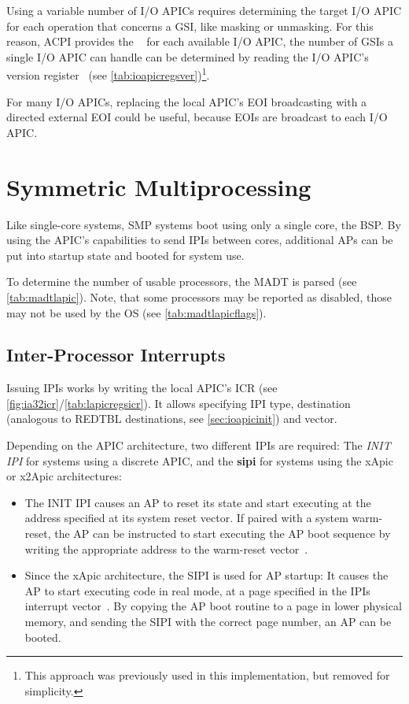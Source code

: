 Using a variable number of I/O APICs requires determining the target I/O APIC for each operation that concerns a GSI, like masking or unmasking.
For this reason, ACPI provides the ~\autocite[sec.~5.2.8.2]{acpi1} for each available I/O APIC, the number of GSIs a single I/O APIC can handle can be determined by reading the I/O APIC's version register~\autocite[sec.~9.5.7]{ich5} (see \autoref{tab:ioapicregsver})\footnote{
  This approach was previously used in this implementation, but removed for simplicity.}.

For many I/O APICs, replacing the local APIC's EOI broadcasting with a directed external EOI could be useful, because EOIs are broadcast to each I/O APIC\@.

\section{Symmetric Multiprocessing}
\label{sec:smpinit}

Like single-core systems, SMP systems boot using only a single core, the BSP\@.
By using the APIC's capabilities to send IPIs between cores, additional APs can be put into startup state and booted for system use.

To determine the number of usable processors, the MADT is parsed (see \autoref{tab:madtlapic}).
Note, that some processors may be reported as disabled, those may not be used by the OS (see \autoref{tab:madtlapicflags}).

\subsection{Inter-Processor Interrupts}
\label{subsec:ipis}

Issuing IPIs works by writing the local APIC's ICR (see \autoref{fig:ia32icr}/\autoref{tab:lapicregsicr}).
It allows specifying IPI type, destination (analogous to REDTBL destinations, see \autoref{sec:ioapicinit}) and vector.

Depending on the APIC architecture, two different IPIs are required: The \textit{INIT IPI} for systems using a discrete APIC, and the \textbf{\gls{sipi}} for systems using the xApic or x2Apic architectures:

\begin{itemize}
  \item The INIT IPI causes an AP to reset its state and start executing at the address specified at its system reset vector.
  If paired with a system warm-reset, the AP can be instructed to start executing the AP boot sequence by writing the appropriate address to the warm-reset vector~\autocite[sec.~B.4.1]{mpspec}.
  \item Since the xApic architecture, the SIPI is used for AP startup: It causes the AP to start executing code in real mode, at a page specified in the IPIs interrupt vector~\autocite[sec.~B.4.2]{mpspec}.
  By copying the AP boot routine to a page in lower physical memory, and sending the SIPI with the correct page number, an AP can be booted.
\end{itemize}

